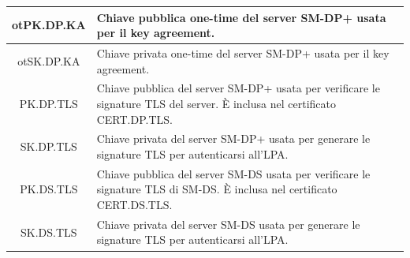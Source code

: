 \documentclass[10pt, oneside]{book}
\begin{document}
\begin{table}[h!]
\begin{center}
\begin{tabularx}{\textwidth}{|c|X|}
\hline
otPK.DP.KA & Chiave pubblica one-time del server SM-DP+ usata per il key agreement.\\
\hline
otSK.DP.KA & Chiave privata one-time del server SM-DP+ usata per il key agreement.\\
\hline
PK.DP.TLS & Chiave pubblica del server SM-DP+ usata per verificare le signature TLS del server. È inclusa nel certificato CERT.DP.TLS.\\
\hline
SK.DP.TLS & Chiave privata del server SM-DP+ usata per generare le signature TLS per autenticarsi all'LPA.\\
\hline
PK.DS.TLS & Chiave pubblica del server SM-DS usata per verificare le signature TLS di SM-DS. È inclusa nel certificato CERT.DS.TLS.\\
\hline
SK.DS.TLS & Chiave privata del server SM-DS usata per generare le signature TLS per autenticarsi all'LPA.\\
\hline
\end{tabularx}
\end{center}
\end{table}
\end{document}
